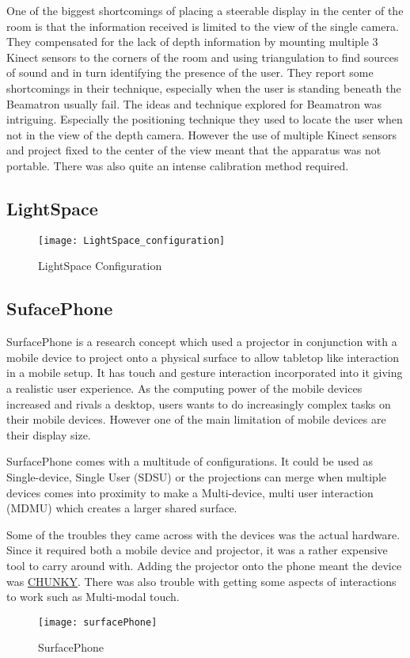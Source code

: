 One of the biggest shortcomings of placing a steerable display in
the center of the room is that the information received is limited
to the view of the single camera. They compensated for the lack of
depth information by mounting multiple 3 Kinect sensors to the corners
of the room and using triangulation to find sources of sound and in
turn identifying the presence of the user. They report some shortcomings
in their technique, especially when the user is standing beneath the
Beamatron usually fail.
The ideas and technique explored for Beamatron was intriguing. Especially
the positioning technique they used to locate the user when not in
the view of the depth camera. However the use of multiple Kinect sensors
and project fixed to the center of the view meant that the apparatus
was not portable. There was also quite an intense calibration method
required.


\subsection{LightSpace}

\begin{figure}[H]
\texttt{[image: LightSpace\_configuration]}

\protect\caption{LightSpace Configuration}
\end{figure}




\subsection{SufacePhone}

SurfacePhone\cite{surfacephone} is a research concept which used
a projector in conjunction with a mobile device to project onto a
physical surface to allow tabletop like interaction in a mobile setup.
It has touch and gesture interaction incorporated into it giving a
realistic user experience. As the computing power of the mobile devices
increased and rivals a desktop, users wants to do increasingly complex
tasks on their mobile devices. However one of the main limitation
of mobile devices are their display size. 

SurfacePhone comes with a multitude of configurations. It could be
used as Single-device, Single User (SDSU) or the projections can merge
when multiple devices comes into proximity to make a Multi-device,
multi user interaction (MDMU) which creates a larger shared surface. 

Some of the troubles they came across with the devices was the actual
hardware. Since it required both a mobile device and projector, it
was a rather expensive tool to carry around with. Adding the projector
onto the phone meant the device was \uline{CHUNKY}. There was also
trouble with getting some aspects of interactions to work such as
Multi-modal touch.
\begin{figure}[H]
\texttt{[image: surfacePhone]}

\protect\caption{SurfacePhone}


\end{figure}

